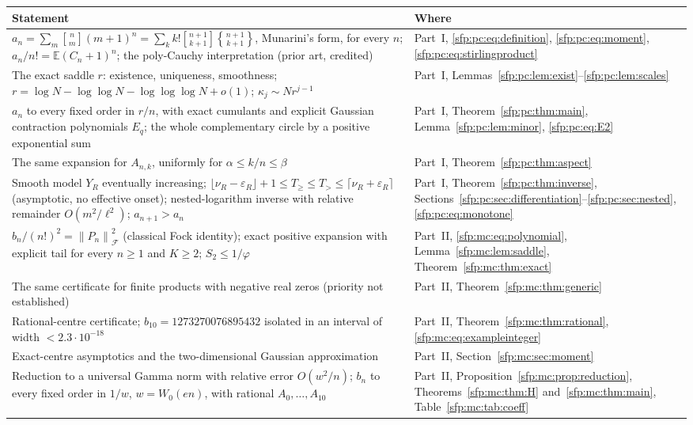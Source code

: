 \documentclass[11pt,letterpaper]{article}
\numberwithin{equation}{section}
\theoremstyle{definition}\newtheorem{definition}[theorem]{Definition}
\theoremstyle{remark}\newtheorem{remark}[theorem]{Remark}
\newcommand{\EE}{\mathbb E}
\newcommand{\eps}{\varepsilon}
\newcommand{\sone}[2]{\genfrac{[}{]}{0pt}{}{#1}{#2}}
\newcommand{\stwo}[2]{\genfrac{\{} {\}}{0pt}{}{#1}{#2}}
\newcommand{\Fock}[1]{\left\lVert #1\right\rVert_{\mathcal F}^{2}}
\begin{document}
\begin{center}
\small
\begin{tabular}{@{}>{\raggedright\arraybackslash}p{} >{\raggedright\arraybackslash}p{}@{}}
\toprule
Statement & Where\\
\midrule
$a_n=\sum_m\sone nm(m+1)^n=\sum_kk!\sone{n+1}{k+1}\stwo{n+1}{k+1}$, Munarini's form, for every $n$; $a_n/n!=\EE(C_n+1)^n$; the poly-Cauchy interpretation (prior art, credited) & Part~I, \eqref{sfp:pc:eq:definition}, \eqref{sfp:pc:eq:moment}, \eqref{sfp:pc:eq:stirlingproduct}\\
The exact saddle $r$: existence, uniqueness, smoothness; $r=\log N-\log\log N-\log\log\log N+o(1)$; $\kappa_j\sim Nr^{j-1}$ & Part~I, Lemmas~\ref{sfp:pc:lem:exist}--\ref{sfp:pc:lem:scales}\\
$a_n$ to every fixed order in $r/n$, with exact cumulants and explicit Gaussian contraction polynomials $E_q$; the whole complementary circle by a positive exponential sum & Part~I, Theorem~\ref{sfp:pc:thm:main}, Lemma~\ref{sfp:pc:lem:minor}, \eqref{sfp:pc:eq:E2}\\
The same expansion for $A_{n,k}$, uniformly for $\alpha\le k/n\le\beta$ & Part~I, Theorem~\ref{sfp:pc:thm:aspect}\\
Smooth model $Y_R$ eventually increasing; $\lfloor\nu_R-\eps_R\rfloor+1\le T_\ge\le T_>\le\lceil\nu_R+\eps_R\rceil$ (asymptotic, no effective onset); nested-logarithm inverse with relative remainder $O(m^2/\ell^2)$; $a_{n+1}>a_n$ & Part~I, Theorem~\ref{sfp:pc:thm:inverse}, Sections~\ref{sfp:pc:sec:differentiation}--\ref{sfp:pc:sec:nested}, \eqref{sfp:pc:eq:monotone}\\
$b_n/(n!)^2=\Fock{P_n}$ (classical Fock identity); exact positive expansion with explicit tail for every $n\ge1$ and $K\ge2$; $S_2\le1/\varphi$ & Part~II, \eqref{sfp:mc:eq:polynomial}, Lemma~\ref{sfp:mc:lem:saddle}, Theorem~\ref{sfp:mc:thm:exact}\\
The same certificate for finite products with negative real zeros (priority not established) & Part~II, Theorem~\ref{sfp:mc:thm:generic}\\
Rational-centre certificate; $b_{10}=1273270076895432$ isolated in an interval of width $<2.3\cdot10^{-18}$ & Part~II, Theorem~\ref{sfp:mc:thm:rational}, \eqref{sfp:mc:eq:exampleinteger}\\
Exact-centre asymptotics and the two-dimensional Gaussian approximation & Part~II, Section~\ref{sfp:mc:sec:moment}\\
Reduction to a universal Gamma norm with relative error $O(w^2/n)$; $b_n$ to every fixed order in $1/w$, $w=W_0(en)$, with rational $A_0,\dots,A_{10}$ & Part~II, Proposition~\ref{sfp:mc:prop:reduction}, Theorems~\ref{sfp:mc:thm:H} and~\ref{sfp:mc:thm:main}, Table~\ref{sfp:mc:tab:coeff}\\

\end{tabular}
\end{center}
\end{document}
